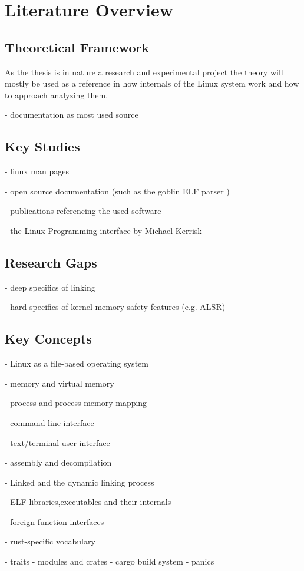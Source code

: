 \chapter{Literature Overview}
\label{cha:lit_overview}

\section{Theoretical Framework}

As the thesis is in nature a research and experimental project the theory will mostly be used as a reference in how internals of the Linux system work and how to approach analyzing them.

- documentation as most used source

\section{Key Studies}

- linux man pages \cite{kerrisk_mmap2_2024}

- open source documentation (such as the goblin ELF parser \cite{m4b_m4bgoblin_2024})

- publications referencing the used software \cite{drepper_how_2011}

- the Linux Programming interface by Michael Kerrisk \cite{kerrisk_linux_2010}

\section{Research Gaps}

- deep specifics of linking

- hard specifics of kernel memory safety features (e.g. ALSR)

\section{Key Concepts}

- Linux as a file-based operating system

- memory and virtual memory

- process and process memory mapping

- command line interface

- text/terminal user interface

- assembly and decompilation

- Linked and the dynamic linking process

- ELF libraries,executables and their internals

- foreign function interfaces

- rust-specific vocabulary
    
    - traits
    - modules and crates
    - cargo build system
    - panics
    